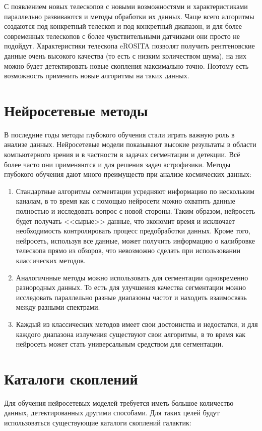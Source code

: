С появлением новых телескопов с новыми возможностями и характеристиками параллельно развиваются и 
методы обработки их данных. Чаще всего алгоритмы создаются под конкретный телескоп и под конкретный 
диапазон, и для более современных телескопов с более чувствительными датчиками они просто не подойдут.
Характеристики телескопа eROSITA позволят получить рентгеновские данные 
очень высокого качества (то есть с низким количеством шума), на них можно будет детектировать новые
скопления максимально точно. Поэтому есть возможность применить новые алгоритмы на таких данных.\\


\section{Нейросетевые методы}
В последние годы методы глубокого обучения стали играть важную роль в анализе данных. Нейросетевые 
модели показывают высокие результаты в области компьютерного зрения и в частности в задачах 
сегментации и детекции. Всё более часто они применяются и для решения задач астрофизики. Методы 
глубокого обучения дают много преимуществ при анализе космических данных: 

\begin{enumerate}
    \item Стандартные алгоритмы сегментации усредняют информацию по нескольким каналам,
        в то время как с помощью нейросети можно охватить данные полностью и исследовать вопрос с 
        новой стороны. Таким образом, нейросеть будет получать <<сырые>> данные, что экономит время 
        и исключает необходимость контролировать процесс предобработки данных. 
        Кроме того, нейросеть, используя все данные, может получить информацию о 
        калибровке телескопа прямо из обзоров, что невозможно сделать при использовании классических 
        методов.
    \item Аналогичнные методы можно использовать для сегментации одновременно разнородных данных. 
        То есть для улучшения качества сегментации можно исследовать параллельно разные диапазоны 
        частот и находить взаимосвязь между разными спектрами.
    \item Каждый из классических методов имеет свои достоинства и недостатки, и для каждого 
        диапазона излучения существуют свои алгоритмы, в то время как 
        нейросеть может стать универсальным средством для сегментации.
\end{enumerate}

\section{Каталоги скоплений}
Для обучения нейросетевых моделей требуется иметь большое количество данных, детектированных другими
способами. Для таких целей будут использоваться существующие каталоги скоплений галактик:

